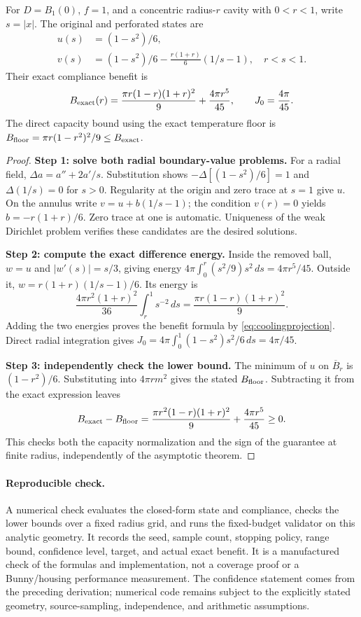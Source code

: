 \begin{proposition}
\label{prop:benefitballreference}
For $D=B_1(0)$, $f=1$, and a concentric radius-$r$ cavity with $0<r<1$,
write $s=|x|$. The original and perforated states are
\begin{align}
 u(s)&=(1-s^2)/6,\\
 v(s)&=(1-s^2)/6-\frac{r(1+r)}6(1/s-1),\quad r<s<1.
\end{align}
Their exact compliance benefit is
\begin{equation}
 B_{\rm exact}(r)=\frac{\pi r(1-r)(1+r)^2}{9}
                       +\frac{4\pi r^5}{45},\qquad J_0=\frac{4\pi}{45}.
 \label{eq:exactballbenefit}
\end{equation}
The direct capacity bound using the exact temperature floor is
$B_{\rm floor}=\pi r(1-r^2)^2/9\le B_{\rm exact}$.
\end{proposition}
\begin{proof}
\textbf{Step 1: solve both radial boundary-value problems.}
For a radial field, $\Delta a=a''+2a'/s$. Substitution shows
$-\Delta[(1-s^2)/6]=1$ and $\Delta(1/s)=0$ for $s>0$.
Regularity at the origin and zero trace at $s=1$ give $u$.
On the annulus write $v=u+b(1/s-1)$; the condition $v(r)=0$ yields
$b=-r(1+r)/6$. Zero trace at one is automatic. Uniqueness of the weak
Dirichlet problem verifies these candidates are the desired solutions.

\textbf{Step 2: compute the exact difference energy.}
Inside the removed ball, $w=u$ and $|w'(s)|=s/3$, giving energy
$4\pi\int_0^r(s^2/9)s^2\,ds=4\pi r^5/45$.
Outside it, $w=r(1+r)(1/s-1)/6$. Its energy is
\[
 \frac{4\pi r^2(1+r)^2}{36}\int_r^1s^{-2}\,ds
 =\frac{\pi r(1-r)(1+r)^2}{9}.
\]
Adding the two energies proves the benefit formula by
\cref{eq:coolingprojection}. Direct radial integration gives
$J_0=4\pi\int_0^1(1-s^2)s^2/6\,ds=4\pi/45$.

\textbf{Step 3: independently check the lower bound.}
The minimum of $u$ on $\overline B_r$ is $(1-r^2)/6$.
Substituting into $4\pi rm^2$ gives the stated $B_{\rm floor}$.
Subtracting it from the exact expression leaves
\[
 B_{\rm exact}-B_{\rm floor}
 =\frac{\pi r^2(1-r)(1+r)^2}{9}+\frac{4\pi r^5}{45}\ge0.
\]
This checks both the capacity normalization and the sign of the guarantee
at finite radius, independently of the asymptotic theorem.
\end{proof}

\paragraph{Reproducible check.}
A numerical check evaluates the closed-form
state and compliance, checks the lower bounds over a fixed radius grid,
and runs the fixed-budget validator on this analytic geometry. It
records the seed, sample count, stopping policy, range bound,
confidence level, target, and actual exact benefit. It is a manufactured
check of the formulas and implementation, not a coverage proof or a
Bunny/housing performance measurement. The confidence statement comes from
the preceding derivation; numerical code remains subject to the explicitly
stated geometry, source-sampling, independence, and arithmetic assumptions.

